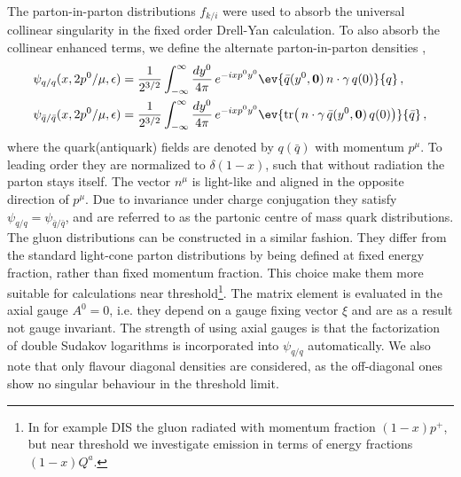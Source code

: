 The parton-in-parton distributions $f_{k/i}$ were used to absorb the universal collinear singularity in the fixed order Drell-Yan calculation. To also absorb the collinear enhanced terms, we define the alternate parton-in-parton densities \cite{Kidonakis:1997gm},
\begin{align}\label{eq:near threshold densities}
    \psi_{q/q}(x, 2p^{0}/\mu,\epsilon)&=\frac{1}{2^{3/2}}\int_{-\infty}^{\infty}\frac{dy^{0}}{4\pi}\,e^{-ixp^{0}y^{0}}\ev{\bar{q}(y^{0},\mathbf{0})\,n\cdot\gamma\,q(0)}{q}\,,
    \\
    \psi_{\bar{q}/\bar{q}}(x, 2p^{0}/\mu,\epsilon)&=\frac{1}{2^{3/2}}\int_{-\infty}^{\infty}\frac{dy^{0}}{4\pi}\,e^{-ixp^{0}y^{0}}\ev{\text{tr}\big(\,n\cdot\gamma\,\bar{q}(y^{0},\mathbf{0})\,q(0)\big)}{\bar{q}}\,,
\end{align}
where the quark(antiquark) fields are denoted by $q(\bar{q})$ with momentum $p^{\mu}$. To leading order they are normalized to $\delta(1-x)$, such that without radiation the parton stays itself. The vector $n^{\mu}$ is light-like and aligned in the opposite direction of $p^{\mu}$. Due to invariance under charge conjugation they satisfy $\psi_{q/q}=\psi_{\bar{q}/\bar{q}}$, and are referred to as the partonic centre of mass quark distributions. The gluon distributions can be constructed in a similar fashion. They differ from the standard light-cone parton distributions by being defined at fixed energy fraction, rather than fixed momentum fraction. This choice make them more suitable for calculations near threshold\footnote{In for example DIS the gluon radiated with momentum fraction $(1-x)p^{+}$, but near threshold we investigate emission in terms of energy fractions $(1-x)Q^{a}$.}. The matrix element is evaluated in the axial gauge $A^{0}=0$, i.e. they depend on a gauge fixing vector $\xi$ and are as a result not gauge invariant. The strength of using axial gauges is that the factorization of double Sudakov logarithms is incorporated into $\psi_{q/q}$ automatically. We also note that only flavour diagonal densities are considered, as the off-diagonal ones show no singular behaviour in the threshold limit. 

